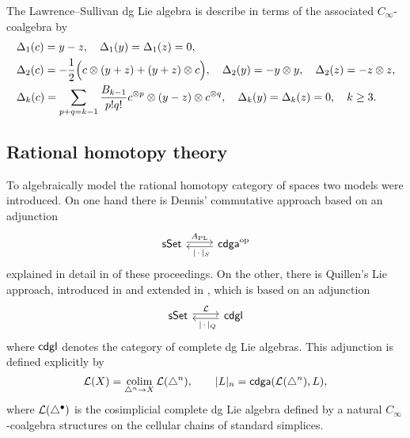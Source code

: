 The Lawrence--Sullivan dg Lie algebra is describe in terms of the associated $C_\infty$-coalgebra by
\begin{align*}
& \Delta_1(c) = y-z, \quad
\Delta_1(y) = \Delta_1(z) = 0, \\
& \Delta_2(c) = -\frac{1}{2} \Big( c \otimes (y+z) + (y+z) \otimes c \Big), \quad
\Delta_2(y) = -y \otimes y, \quad
\Delta_2(z) = -z \otimes z, \\
& \Delta_k(c) = \sum_{p+q=k-1} \frac{B_{k-1}}{p!q!} c^{\otimes p} \otimes (y-z) \otimes c^{\otimes q}, \quad
\Delta_k(y) = \Delta_k(z) = 0, \quad k \geq 3.
\end{align*}

\subsection{Rational homotopy theory} \label{ss:cdgl model}

To algebraically model the rational homotopy category of spaces two models were introduced.
On one hand there is Dennis' commutative approach \cite{sullivan1977infinitesimal} based on an adjunction
\[
\begin{tikzcd}
\sSet \arrow[r, shift left=2pt, "A_{\mathrm{PL}}"] &
\cdga^\op \arrow[l, shift left=2pt, "\ \bars{\,\cdot\,}_S"]
\end{tikzcd}
\]
explained in detail in \cite{bibid} of these proceedings.
On the other, there is Quillen's Lie approach, introduced in \cite{quillen1969rational} and extended in \cite{buijs2013algebraicmodels, buijs2020liemodels}, which is based on an adjunction
\[
\begin{tikzcd}
\sSet \arrow[r, shift left=2pt, "\cL"] &
\cdgl \arrow[l, shift left=2pt, "\ \bars{\,\cdot\,}_Q"]
\end{tikzcd}
\]
where $\mathsf{cdgl}$ denotes the category of complete dg Lie algebras.
This adjunction is defined explicitly by
\[
\mathcal{L}(X) = \operatorname*{colim}_{\triangle^n \to X} \mathcal{L}(\triangle^n), \qquad
\lvert L\rvert_n = \mathsf{cdga}(\mathcal{L}(\triangle^n), L),
\]
where $\mathcal{L}(\triangle^\bullet)$ is the cosimplicial complete dg Lie algebra defined by a natural $C_\infty$-coalgebra structures on the cellular chains of standard simplices.

